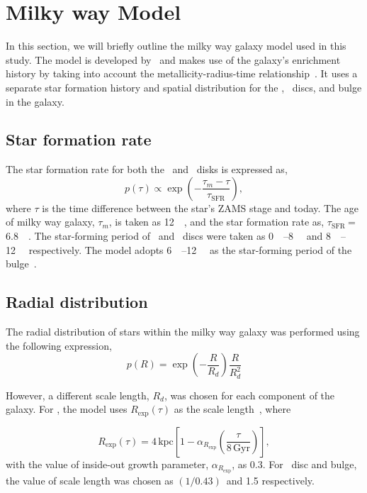 \section{Milky way Model}
\label{sec:milky_way}
In this section, we will briefly outline the milky way galaxy model used in this study.
The model is developed by~\cite{wagg2021gravitational} and makes use of the galaxy's enrichment history by taking
into account the metallicity-radius-time relationship~\cite{Frankel2018}.
It uses a separate star formation history and spatial distribution for the \lowalpha, \highalpha\ discs, and bulge in the galaxy.

\subsection{Star formation rate}
\label{subsec:star_formation_rate}
The star formation rate for both the \lowalpha\ and \highalpha\ disks is expressed as,
\begin{equation}
    p(\tau) \propto \exp\left(-\frac{\tau_m - \tau}{\tau_\text{SFR}}\right),
    \label{eq:star_formation_rate_equation}
\end{equation}
where $\tau$ is the time difference between the star's ZAMS stage and today.
The age of milky way galaxy, $\tau_m$, is taken as \SI{12}{\giga\yr}, and the star formation rate as, $\tau_\text{
    SFR}\ $= \SI{6.8}{\giga\yr}.
The star-forming period of \lowalpha\ and \highalpha\ discs were taken as \SIrange{0}{8}{\giga\yr} and \SIrange{8}{12}{\giga\yr} respectively.
The model adopts \SIrange{6}{12}{\giga\yr} as the star-forming period of the bulge~\cite{Bovy2019}.

\subsection{Radial distribution}
\label{subsec:radial_distribution}
The radial distribution of stars within the milky way galaxy was performed using the following expression,
\begin{equation}%
    p(R) = \exp\left(-\frac{R}{R_d}\right)\frac{R}{R_d^2}
    \label{eq:radial_distribution_of_stars}
\end{equation}%

However, a different scale length, $R_d$, was chosen for each component of the galaxy.
For \lowalpha, the model uses $R_\text{exp}(\tau)$ as the scale length~\cite[Eq 6]{Frankel2018}, where

\begin{equation}%
    R_\text{exp}(\tau) = 4\,\text{kpc}\left[1 - \alpha_{R_\text{exp}}\left(\frac{\tau}{8\,\text{Gyr}}\right)\right],
    \label{eq:exponential_radius_equation}
\end{equation}%
with the value of inside-out growth parameter, $\alpha_{R_\text{exp}}$, as 0.3. For \highalpha\ disc and bulge, the value of scale length was chosen as $(1/0.43)\,$\si{\kpc} and \SI{1.5}{\kpc} respectively.


